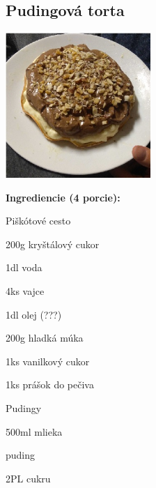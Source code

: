 \setcounter{step}{0}

\subsection{ Pudingová torta }

\begin{ingredient}
  
      \includegraphics[height=5.5cm]{images/eh_torta}
  
  \def\portions{  }
  \textbf{ {\normalsize Ingrediencie (4 porcie):} }

  \begin{main}
      \item 
  \end{main}
  
    \begin{subingredient}{Piškótové cesto}
        \item 200g kryštálový cukor
        \item 1dl voda
        \item 4ks vajce
        \item 1dl olej (???)
        \item 200g hladká múka
        \item 1ks vanilkový cukor
        \item 1ks prášok do pečiva
    \end{subingredient}
  
    \begin{subingredient}{Pudingy}
        \item 500ml mlieka
        \item puding
        \item 2PL cukru
    \end{subingredient}
  
\end{ingredient}
